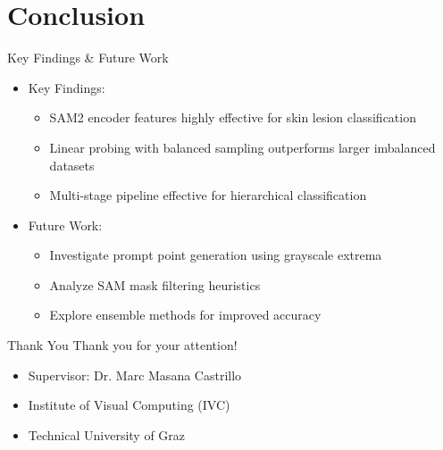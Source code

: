 \documentclass[aspectratio=169]{beamer}
\begin{document}
\section{Conclusion}

\begin{frame}{Key Findings \& Future Work}
  \begin{itemize}
    \item Key Findings:
      \begin{itemize}
        \item SAM2 encoder features highly effective for skin lesion classification
        \item Linear probing with balanced sampling outperforms larger imbalanced datasets
        \item Multi-stage pipeline effective for hierarchical classification
      \end{itemize}
    \item Future Work:
      \begin{itemize}
        \item Investigate prompt point generation using grayscale extrema
        \item Analyze SAM mask filtering heuristics
        \item Explore ensemble methods for improved accuracy
      \end{itemize}
  \end{itemize}
\end{frame}

\begin{frame}{Thank You}
  \centering
  \Large Thank you for your attention!
  
  \vspace{1cm}
  \normalsize
  \begin{itemize}
    \item Supervisor: Dr. Marc Masana Castrillo
    \item Institute of Visual Computing (IVC)
    \item Technical University of Graz
  \end{itemize}
\end{frame}
\end{document}
